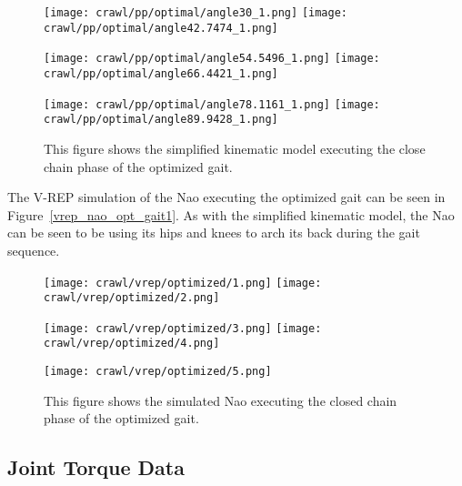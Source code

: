 \begin{figure}
\centering
\texttt{[image: crawl/pp/optimal/angle30\_1.png]}
\texttt{[image: crawl/pp/optimal/angle42.7474\_1.png]}

\centering
\texttt{[image: crawl/pp/optimal/angle54.5496\_1.png]}
\texttt{[image: crawl/pp/optimal/angle66.4421\_1.png]}

\centering
\texttt{[image: crawl/pp/optimal/angle78.1161\_1.png]}
\texttt{[image: crawl/pp/optimal/angle89.9428\_1.png]}

\caption{This figure shows the simplified kinematic model executing the close
         chain phase of the optimized gait.}
\label{fig:pp_opt_gait1}
\end{figure}

The V-REP simulation of the Nao executing the optimized gait can be seen in
Figure~\ref{vrep_nao_opt_gait1}. As with the
simplified kinematic model, the Nao can be seen to be using its hips and knees to arch its back during the gait sequence.

\begin{figure}
\centering
\texttt{[image: crawl/vrep/optimized/1.png]}
\texttt{[image: crawl/vrep/optimized/2.png]}

\centering
\texttt{[image: crawl/vrep/optimized/3.png]}
\texttt{[image: crawl/vrep/optimized/4.png]}

\centering
\texttt{[image: crawl/vrep/optimized/5.png]}

\caption{This figure shows the simulated Nao executing the closed chain phase of the
         optimized gait.}
\label{fig:vrep_nao_opt_gait1}
\end{figure}

\subsection{Joint Torque Data} \label{subsec:opt_joint_torque_data}

